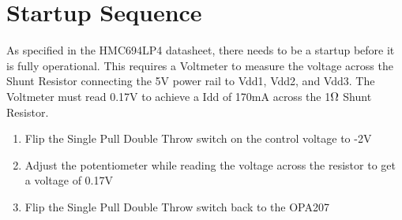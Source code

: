 \section{Startup Sequence}
As specified in the HMC694LP4 datasheet, there needs to be a startup before it is fully operational. This requires a Voltmeter to measure the voltage across the Shunt Resistor connecting the 5V power rail to Vdd1, Vdd2, and Vdd3. The Voltmeter must read 0.17V to achieve a Idd of 170mA across the 1$\ohm$ Shunt Resistor.


\begin{enumerate}
    \item Flip the Single Pull Double Throw switch on the control voltage to -2V

    \item Adjust the potentiometer while reading the voltage across the resistor to get a voltage of 0.17V

    \item Flip the Single Pull Double Throw switch back to the OPA207
\end{enumerate}